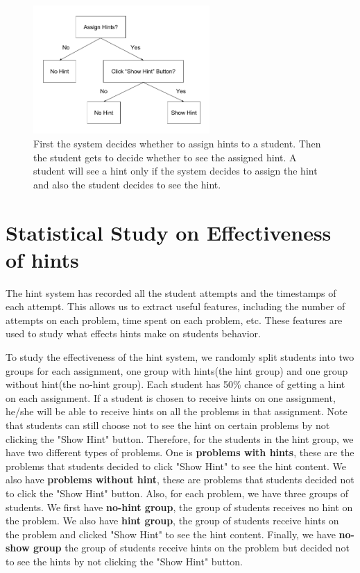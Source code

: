 \documentclass{llncs}
\begin{document}
\begin{figure}[ht]
   \centering
   \includegraphics[width=0.6\textwidth]{image/Show_Hint.png}
   \caption{First the system decides whether to assign hints to a student. Then the student gets to decide whether to see the assigned hint. A student will see a hint only if the system decides to assign the hint and also the student decides to see the hint.}
   \label{fig:show_hint}
\end{figure}


\section{Statistical Study on Effectiveness of hints}
The hint system has recorded all the student attempts and the timestamps of each attempt. This allows us to extract useful features, including the number of attempts on each problem, time spent on each problem, etc. These features are used to study what effects hints make on students behavior.

To study the effectiveness of the hint system, we randomly split students into two groups for each assignment, one group with hints(the hint group) and one group without hint(the no-hint group). Each student has 50\% chance of getting a hint on each assignment. If a student is chosen to receive hints on one assignment, he/she will be able to receive hints on all the problems in that assignment. Note that students can still choose not to see the hint on certain problems by not clicking the "Show Hint" button. Therefore, for the students in the hint group, we have two different types of problems. One is \textbf{problems with hints}, these are the problems that students decided to click "Show Hint" to see the hint content. We also have \textbf{problems without hint}, these are problems that students decided not to click the "Show Hint" button. Also, for each problem, we have three groups of students. We first have \textbf{no-hint group}, the group of students receives no hint on the problem. We also have \textbf{hint group}, the group of students receive hints on the problem and clicked "Show Hint" to see the hint content. Finally, we have \textbf{no-show group} the group of students receive hints on the problem but decided not to see the hints by not clicking the "Show Hint" button.
\end{document}
